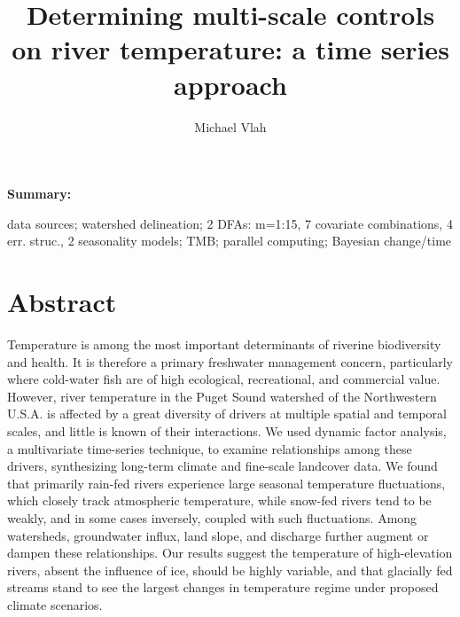 \documentclass[notitlepage]{article}
\author{Michael Vlah}
\title{Determining multi-scale controls on river temperature: a time series approach}
\begin{document}

\maketitle
\vspace{10pc}
\noindent
\textbf{Summary:}

 data sources; watershed delineation; 2 DFAs: m=1:15, 7 covariate combinations, 4 err. struc., 2 seasonality models; TMB; parallel computing; Bayesian change/time
\clearpage
{}

\section*{Abstract}
Temperature is among the most important determinants of riverine biodiversity and health. It is therefore a primary freshwater management concern, particularly where cold-water fish are of high ecological, recreational, and commercial value. However, river temperature in the Puget Sound watershed of the Northwestern U.S.A. is affected by a great diversity of drivers at multiple spatial and temporal scales, and little is known of their interactions. We used dynamic factor analysis, a multivariate time-series technique, to examine relationships among these drivers, synthesizing long-term climate and fine-scale landcover data. We found that primarily rain-fed rivers experience large seasonal temperature fluctuations, which closely track atmospheric temperature, while snow-fed rivers tend to be weakly, and in some cases inversely, coupled with such fluctuations. Among watersheds, groundwater influx, land slope, and discharge further augment or dampen these relationships. Our results suggest the temperature of high-elevation rivers, absent the influence of ice, should be highly variable, and that glacially fed streams stand to see the largest changes in temperature regime under proposed climate scenarios.
\clearpage
\end{document}
